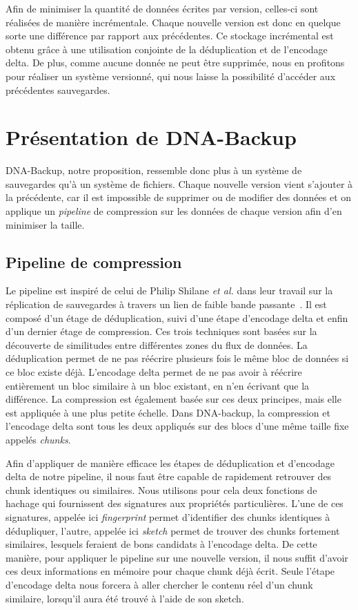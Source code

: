 \documentclass[a4paper]{report}
\makeatletter
\newcommand{\etal}{\emph{et al.}\@\xspace}
\makeatother
\begin{document}
Afin de minimiser la quantité de données écrites par version, celles-ci sont réalisées de manière incrémentale.
Chaque nouvelle version est donc en quelque sorte une différence par rapport aux précédentes.
Ce stockage incrémental est obtenu grâce à une utilisation conjointe de la déduplication et de l'encodage delta.
De plus, comme aucune donnée ne peut être supprimée,
nous en profitons pour réaliser un système versionné,
qui nous laisse la possibilité d'accéder aux précédentes sauvegardes.


\chapter{Présentation de DNA-Backup}

DNA-Backup, notre proposition, ressemble donc plus à un système de sauvegardes qu'à un système de fichiers.
Chaque nouvelle version vient s'ajouter à la précédente, car il est impossible de supprimer ou de modifier des données
et on applique un \emph{pipeline} de compression sur les données de chaque version afin d'en minimiser la taille.

\section{Pipeline de compression}

Le pipeline est inspiré de celui de Philip Shilane \etal
dans leur travail sur la réplication de sauvegardes à travers un lien de faible bande passante~\cite{shilane2012wan}.
Il est composé d'un étage de déduplication, suivi d'une étape d'encodage delta
et enfin d'un dernier étage de compression.
Ces trois techniques sont basées sur la découverte de similitudes entre différentes zones du flux de données.
La déduplication permet de ne pas réécrire plusieurs fois le même bloc de données si ce bloc existe déjà.
L'encodage delta permet de ne pas avoir à réécrire entièrement un bloc similaire à un bloc existant,
en n'en écrivant que la différence.
La compression est également basée sur ces deux principes, mais elle est appliquée à une plus petite échelle.
Dans DNA-backup, la compression et l'encodage delta sont tous les deux appliqués sur des blocs d'une même taille fixe appelés \emph{chunks}.

Afin d'appliquer de manière efficace les étapes de déduplication et d'encodage delta de notre pipeline,
il nous faut être capable de rapidement retrouver des chunk identiques ou similaires.
Nous utilisons pour cela deux fonctions de hachage qui fournissent des signatures aux propriétés particulières.
L'une de ces signatures, appelée ici \emph{fingerprint} permet d'identifier des chunks identiques à dédupliquer,
l'autre, appelée ici \emph{sketch} permet de trouver des chunks fortement similaires,
lesquels feraient de bons candidats à l'encodage delta.
De cette manière, pour appliquer le pipeline sur une nouvelle version,
il nous suffit d'avoir ces deux informations en mémoire pour chaque chunk déjà écrit.
Seule l'étape d'encodage delta nous forcera à aller chercher le contenu réel d'un chunk similaire,
lorsqu'il aura été trouvé à l'aide de son sketch.
\end{document}
